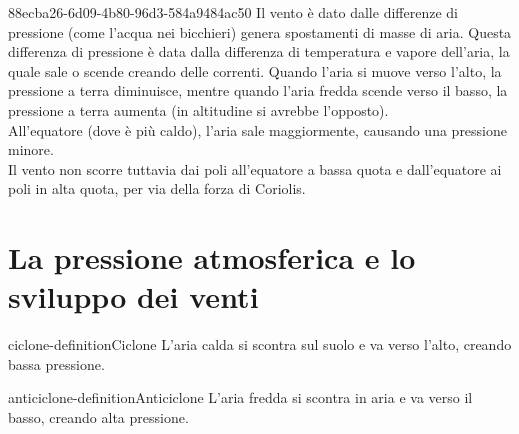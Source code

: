 \documentclass[preview]{standalone}
\begin{document}
\begin{snippet}{88ecba26-6d09-4b80-96d3-584a9484ac50}
    Il vento è dato dalle differenze di pressione (come l'acqua nei bicchieri)
    genera spostamenti di masse di aria.
    Questa differenza di pressione è data dalla differenza di temperatura e vapore dell'aria,
    la quale sale o scende creando delle correnti.
    Quando l'aria si muove verso l'alto, la pressione a terra diminuisce,
    mentre quando l'aria fredda scende verso il basso, la pressione a terra aumenta
    (in altitudine si avrebbe l'opposto).
    \\
    All'equatore (dove è più caldo), l'aria sale maggiormente, causando una pressione minore.
    \\
    Il vento non scorre tuttavia dai poli all'equatore a bassa quota e dall'equatore ai poli in alta quota,
    per via della forza di Coriolis.
\end{snippet}

\section{La pressione atmosferica e lo sviluppo dei venti}

\begin{snippetdefinition}{ciclone-definition}{Ciclone}
    L'aria calda si scontra sul suolo e va verso l'alto, creando bassa pressione.
\end{snippetdefinition}

\begin{snippetdefinition}{anticiclone-definition}{Anticiclone}
    L'aria fredda si scontra in aria e va verso il basso, creando alta pressione.
\end{snippetdefinition}
\end{document}
